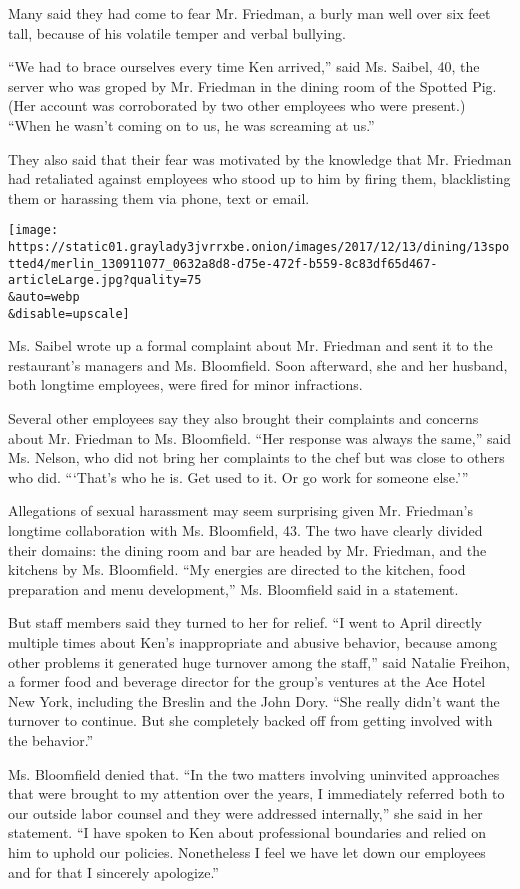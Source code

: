 Many said they had come to fear Mr. Friedman, a burly man well over six
feet tall, because of his volatile temper and verbal bullying.

``We had to brace ourselves every time Ken arrived,'' said Ms. Saibel,
40, the server who was groped by Mr. Friedman in the dining room of the
Spotted Pig. (Her account was corroborated by two other employees who
were present.) ``When he wasn't coming on to us, he was screaming at
us.''

They also said that their fear was motivated by the knowledge that Mr.
Friedman had retaliated against employees who stood up to him by firing
them, blacklisting them or harassing them via phone, text or email.

\texttt{[image: https://static01.graylady3jvrrxbe.onion/images/2017/12/13/dining/13spotted4/merlin\_130911077\_0632a8d8-d75e-472f-b559-8c83df65d467-articleLarge.jpg?quality=75\\\&auto=webp\\\&disable=upscale]}

Ms. Saibel wrote up a formal complaint about Mr. Friedman and sent it to
the restaurant's managers and Ms. Bloomfield. Soon afterward, she and
her husband, both longtime employees, were fired for minor infractions.

Several other employees say they also brought their complaints and
concerns about Mr. Friedman to Ms. Bloomfield. ``Her response was always
the same,'' said Ms. Nelson, who did not bring her complaints to the
chef but was close to others who did. ```That's who he is. Get used to
it. Or go work for someone else.'''

Allegations of sexual harassment may seem surprising given Mr.
Friedman's longtime collaboration with Ms. Bloomfield, 43. The two have
clearly divided their domains: the dining room and bar are headed by Mr.
Friedman, and the kitchens by Ms. Bloomfield. ``My energies are directed
to the kitchen, food preparation and menu development,'' Ms. Bloomfield
said in a statement.

But staff members said they turned to her for relief. ``I went to April
directly multiple times about Ken's inappropriate and abusive behavior,
because among other problems it generated huge turnover among the
staff,'' said Natalie Freihon, a former food and beverage director for
the group's ventures at the Ace Hotel New York, including the Breslin
and the John Dory. ``She really didn't want the turnover to continue.
But she completely backed off from getting involved with the behavior.''

Ms. Bloomfield denied that. ``In the two matters involving uninvited
approaches that were brought to my attention over the years, I
immediately referred both to our outside labor counsel and they were
addressed internally,'' she said in her statement. ``I have spoken to
Ken about professional boundaries and relied on him to uphold our
policies. Nonetheless I feel we have let down our employees and for that
I sincerely apologize.''

